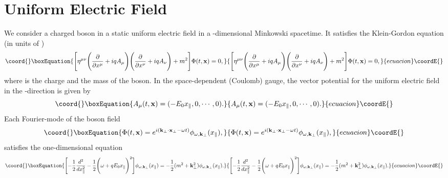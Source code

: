 \documentclass[a4paper,prd,showpacs,preprintnumbers,amsmath,amssymb]{revtex4}
\begin{document}
\section{Uniform Electric Field}



We consider a charged boson in a static uniform electric field in
a \coordHE{}-dimensional Minkowski spacetime. It satisfies the
Klein-Gordon equation (in units of \coordHE{})
\begin{equation}\coord{}\boxEquation{
\Biggl[\eta^{\mu \nu} \Biggl(\frac{\partial}{\partial x^{\mu}} + i
q A_{\mu} \Biggr) \Biggl(\frac{\partial}{\partial x^{\nu}} + i q
A_{\nu} \Biggr)  + m^2 \Biggr] \Phi (t, {\bf x}) = 0, \label{kg
eq}
}{
\Biggl[\eta^{\mu \nu} \Biggl(\frac{\partial}{\partial x^{\mu}} + i
q A_{\mu} \Biggr) \Biggl(\frac{\partial}{\partial x^{\nu}} + i q
A_{\nu} \Biggr)  + m^2 \Biggr] \Phi (t, {\bf x}) = 0, }{ecuacion}\coordE{}\end{equation}
where \coordHE{} is the charge and \coordHE{} the mass of the boson. In the
space-dependent (Coulomb) gauge, the vector potential for the
uniform electric field in the \coordHE{}-direction is given
by
\begin{equation}\coord{}\boxEquation{
A_{\mu} (t, {\bf x}) = ( - E_0 x_{\parallel}, 0, \cdots, 0).
}{
A_{\mu} (t, {\bf x}) = ( - E_0 x_{\parallel}, 0, \cdots, 0).
}{ecuacion}\coordE{}\end{equation}
Each Fourier-mode of the boson field
\begin{equation}\coord{}\boxEquation{
\Phi (t, {\bf x}) = e^{i ( {\bf k}_{\perp} \cdot {\bf x}_{\perp} -
\omega t)} \phi_{\omega, {\bf k}_{\perp}} (x_{\parallel}),
}{
\Phi (t, {\bf x}) = e^{i ( {\bf k}_{\perp} \cdot {\bf x}_{\perp} -
\omega t)} \phi_{\omega, {\bf k}_{\perp}} (x_{\parallel}),
}{ecuacion}\coordE{}\end{equation}
satisfies the one-dimensional equation
\begin{equation}\coord{}\boxEquation{
\Biggl[- \frac{1}{2} \frac{d^2}{dx_{\parallel}^2} -
\frac{1}{2}\Biggl( \omega + q E_0 x_{\parallel} \Biggr)^2 \Biggr]
\phi_{\omega, {\bf k}_{\perp}} (x_{\parallel}) = - \frac{1}{2}(m^2
+ {\bf k}_{\perp}^2) \phi_{\omega, {\bf k}_{\perp}}
(x_{\parallel}). \label{mod eq}
}{
\Biggl[- \frac{1}{2} \frac{d^2}{dx_{\parallel}^2} -
\frac{1}{2}\Biggl( \omega + q E_0 x_{\parallel} \Biggr)^2 \Biggr]
\phi_{\omega, {\bf k}_{\perp}} (x_{\parallel}) = - \frac{1}{2}(m^2
+ {\bf k}_{\perp}^2) \phi_{\omega, {\bf k}_{\perp}}
(x_{\parallel}). }{ecuacion}\coordE{}\end{equation}
\end{document}

